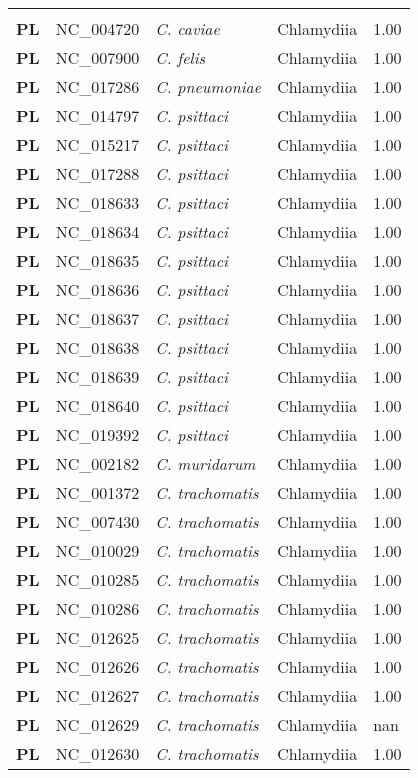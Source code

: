 \begin{adjustwidth}{-3cm}{2cm}
{\begin{supertabular}{>{\bfseries}l|p{0.1\textwidth}p{0.14\textwidth}l|l}
\hline\\
PL & NC\_004720 & \textit{C. caviae} & Chlamydiia & 1.00\\
PL & NC\_007900 & \textit{C. felis} & Chlamydiia & 1.00\\
PL & NC\_017286 & \textit{C. pneumoniae} & Chlamydiia & 1.00\\
PL & NC\_014797 & \textit{C. psittaci} & Chlamydiia & 1.00\\
PL & NC\_015217 & \textit{C. psittaci} & Chlamydiia & 1.00\\
PL & NC\_017288 & \textit{C. psittaci} & Chlamydiia & 1.00\\
PL & NC\_018633 & \textit{C. psittaci} & Chlamydiia & 1.00\\
PL & NC\_018634 & \textit{C. psittaci} & Chlamydiia & 1.00\\
PL & NC\_018635 & \textit{C. psittaci} & Chlamydiia & 1.00\\
PL & NC\_018636 & \textit{C. psittaci} & Chlamydiia & 1.00\\
PL & NC\_018637 & \textit{C. psittaci} & Chlamydiia & 1.00\\
PL & NC\_018638 & \textit{C. psittaci} & Chlamydiia & 1.00\\
PL & NC\_018639 & \textit{C. psittaci} & Chlamydiia & 1.00\\
PL & NC\_018640 & \textit{C. psittaci} & Chlamydiia & 1.00\\
PL & NC\_019392 & \textit{C. psittaci} & Chlamydiia & 1.00\\
PL & NC\_002182 & \textit{C. muridarum} & Chlamydiia & 1.00\\
PL & NC\_001372 & \textit{C. trachomatis} & Chlamydiia & 1.00\\
PL & NC\_007430 & \textit{C. trachomatis} & Chlamydiia & 1.00\\
PL & NC\_010029 & \textit{C. trachomatis} & Chlamydiia & 1.00\\
PL & NC\_010285 & \textit{C. trachomatis} & Chlamydiia & 1.00\\
PL & NC\_010286 & \textit{C. trachomatis} & Chlamydiia & 1.00\\
PL & NC\_012625 & \textit{C. trachomatis} & Chlamydiia & 1.00\\
PL & NC\_012626 & \textit{C. trachomatis} & Chlamydiia & 1.00\\
PL & NC\_012627 & \textit{C. trachomatis} & Chlamydiia & 1.00\\
PL & NC\_012629 & \textit{C. trachomatis} & Chlamydiia & nan\\
PL & NC\_012630 & \textit{C. trachomatis} & Chlamydiia & 1.00\\

\end{supertabular}}
\end{adjustwidth}
